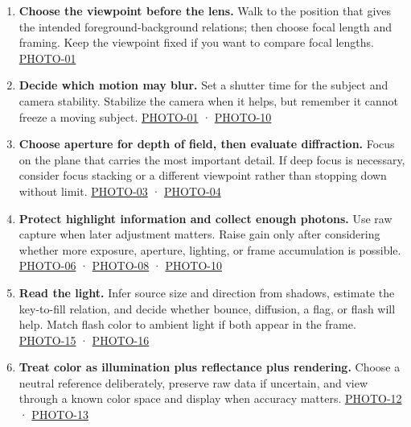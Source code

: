 \begin{enumerate}
\def\labelenumi{\arabic{enumi}.}
\tightlist
\item
  \textbf{Choose the viewpoint before the lens.} Walk to the position that gives the intended foreground-background relations; then choose focal length and framing. Keep the viewpoint fixed if you want to compare focal lengths. \hyperref[04-visual-computing-ii-ch036-photo-01---photography-session-01]{PHOTO-01}
\item
  \textbf{Decide which motion may blur.} Set a shutter time for the subject and camera stability. Stabilize the camera when it helps, but remember it cannot freeze a moving subject. \hyperref[04-visual-computing-ii-ch036-photo-01---photography-session-01]{PHOTO-01} · \hyperref[04-visual-computing-ii-ch036-photo-10---photography-session-10]{PHOTO-10}
\item
  \textbf{Choose aperture for depth of field, then evaluate diffraction.} Focus on the plane that carries the most important detail. If deep focus is necessary, consider focus stacking or a different viewpoint rather than stopping down without limit. \hyperref[04-visual-computing-ii-ch036-photo-03---photography-session-03]{PHOTO-03} · \hyperref[04-visual-computing-ii-ch036-photo-04---photography-session-04]{PHOTO-04}
\item
  \textbf{Protect highlight information and collect enough photons.} Use raw capture when later adjustment matters. Raise gain only after considering whether more exposure, aperture, lighting, or frame accumulation is possible. \hyperref[04-visual-computing-ii-ch036-photo-06---photography-session-06]{PHOTO-06} · \hyperref[04-visual-computing-ii-ch036-photo-08---photography-session-08]{PHOTO-08} · \hyperref[04-visual-computing-ii-ch036-photo-10---photography-session-10]{PHOTO-10}
\item
  \textbf{Read the light.} Infer source size and direction from shadows, estimate the key-to-fill relation, and decide whether bounce, diffusion, a flag, or flash will help. Match flash color to ambient light if both appear in the frame. \hyperref[04-visual-computing-ii-ch036-photo-15---photography-session-15]{PHOTO-15} · \hyperref[04-visual-computing-ii-ch036-photo-16---photography-session-16]{PHOTO-16}
\item
  \textbf{Treat color as illumination plus reflectance plus rendering.} Choose a neutral reference deliberately, preserve raw data if uncertain, and view through a known color space and display when accuracy matters. \hyperref[04-visual-computing-ii-ch036-photo-12---photography-session-12]{PHOTO-12} · \hyperref[04-visual-computing-ii-ch036-photo-13---photography-session-13]{PHOTO-13}

\end{enumerate}
